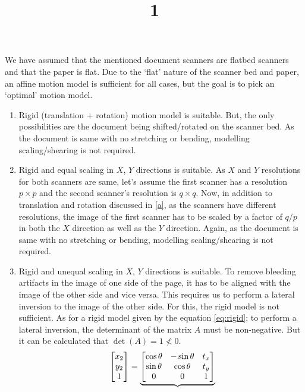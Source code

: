 \documentclass[a4paper]{article}
\title{1}
\date{}
\begin{document}
\maketitle
We have assumed that the mentioned document scanners are flatbed scanners and that the paper is flat. Due to the `flat' nature of the scanner bed and paper, an affine motion model is sufficient for all cases, but the goal is to pick an `optimal' motion model.
\begin{enumerate}[label=(\alph*)]
	\item \label{a} Rigid (translation + rotation) motion model is suitable. But, the only possibilities are the document being shifted/rotated on the scanner bed. As the document is same with no stretching or bending, modelling scaling/shearing is not required.
	\item Rigid and equal scaling in $X$, $Y$ directions is suitable. As $X$ and $Y$ resolutions for both scanners are same, let's assume the first scanner has a resolution $p \times p$ and the second scanner's resolution is $q \times q$. Now, in addition to translation and rotation discussed in \ref{a}, as the scanners have different resolutions, the image of the first scanner has to be scaled by a factor of $q/p$ in both the $X$ direction as well as the $Y$ direction. Again, as the document is same with no stretching or bending, modelling scaling/shearing is not required.
	\item Rigid and unequal scaling in $X$, $Y$ directions is suitable. To remove bleeding artifacts in the image of one side of the page, it has to be aligned with the image of the other side and vice versa. This requires us to perform a lateral inversion to the image of the other side. For this, the rigid model is not sufficient. As for a rigid model given by the equation \ref{eq:rigid}; to perform a lateral inversion, the determinant of the matrix $A$ must be non-negative. But it can be calculated that $\operatorname{det}(A)=1 \nless 0$.
	\begin{equation}{\label{eq:rigid}}
		\begin{bmatrix}
			x_2\\y_2\\1
		\end{bmatrix}
		=
		\underbrace{
		\begin{bmatrix}
			\cos\theta & -\sin\theta & t_x\\
			\sin\theta & \cos\theta  & t_y\\
			0          & 0           & 1\\
		\end{bmatrix}
}
\end{equation}
\end{enumerate}
\end{document}
